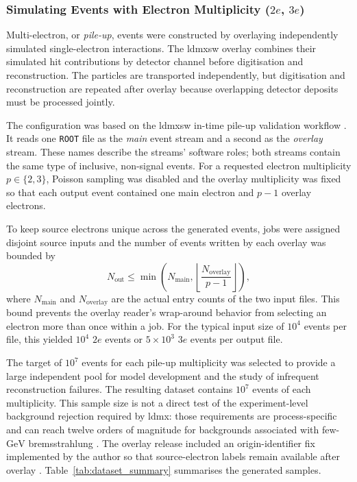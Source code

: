 \subsubsection{Simulating Events with Electron Multiplicity ($2e$, $3e$)}
\label{sec:2e_sim}

Multi-electron, or \emph{pile-up}, events were constructed by overlaying
independently simulated single-electron interactions. The \gls{ldmxsw}
overlay combines their simulated hit contributions by detector channel before
digitisation and reconstruction. The particles are transported independently,
but digitisation and reconstruction are repeated after overlay because
overlapping detector deposits must be processed jointly.

The configuration was based on the \gls{ldmxsw} in-time pile-up
validation workflow \cite{ldmx-github-itpileup}. It reads one \texttt{ROOT} file as the
\emph{main} event stream and a second as the \emph{overlay} stream. These names
describe the streams' software roles; both streams contain the same type of
inclusive, non-signal events. For a requested electron multiplicity
\(p\in\{2,3\}\), Poisson sampling was disabled and the overlay multiplicity was
fixed so that each output event contained one main electron and \(p-1\)
overlay electrons. 

To keep source electrons unique across the generated events, jobs were
assigned disjoint source inputs and the number of events written by each
overlay was bounded by
\begin{equation}
    N_{\mathrm{out}}
    \leq
    \min\left(
        N_{\mathrm{main}},
        \left\lfloor
            \frac{N_{\mathrm{overlay}}}{p-1}
        \right\rfloor
    \right),
\end{equation}
where \(N_{\mathrm{main}}\) and \(N_{\mathrm{overlay}}\) are the actual entry
counts of the two input files. This bound prevents the overlay reader's
wrap-around behavior from selecting an electron more than once within a job.
For the typical input size of \(10^4\) events per file, this yielded \(10^4\)
\(2e\) events or \(5\times10^3\) \(3e\) events per output file.

The target of \(10^7\) events for each pile-up multiplicity was selected to
provide a large independent pool for model development and the study of
infrequent reconstruction failures. The resulting dataset contains
\(10^7\) events of each multiplicity. This sample size is not a direct test of the
experiment-level background rejection required by \gls{ldmx}: those
requirements are
process-specific and can reach twelve orders of magnitude for backgrounds
associated with few-\(\mathrm{GeV}\) bremsstrahlung
\cite{akesson2020-photon-veto}. 
The overlay release included an origin-identifier fix implemented by the
author so that source-electron labels remain available after overlay
\cite{petren2026-ldmx-origin-id-pr}. Table~\ref{tab:dataset_summary}
summarises the generated samples.


